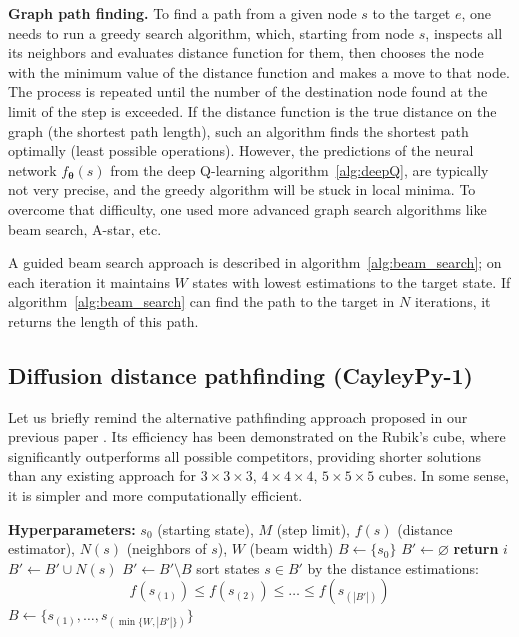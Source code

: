 \documentclass[reqno,11pt]{amsart}
\begin{document}
{\bf Graph path finding.}
To find a path from a given node $s$ to the target  $e$, one needs to run a greedy search algorithm, which, starting from node $s$, inspects all its neighbors and evaluates distance function for them, then chooses the node with the minimum value of the distance function and makes a move to that node. The process is repeated until the number of the destination node found at the limit of the step is exceeded. If the distance function is the true distance on the graph (the shortest path length), such an algorithm finds the shortest path optimally (least possible operations). However, the predictions of the neural network $f_{\boldsymbol \theta}(s)$ from the deep Q-learning algorithm~\ref{alg:deepQ}, are typically not very precise, and the greedy algorithm will be stuck in local minima. To overcome that difficulty, one used more advanced graph search algorithms like beam search, A-star, etc. 

A guided beam search approach is described in algorithm~\ref{alg:beam_search}; on each iteration it maintains $W$ states with lowest estimations to the target state. If algorithm~\ref{alg:beam_search} can find the path to the target in $N$ iterations, it returns the length of this path.


\subsection{Diffusion distance pathfinding (CayleyPy-1)}\label{sec-DD}
Let us briefly remind the alternative pathfinding approach proposed in our previous paper \cite{chervov2025machinelearningapproachbeats}. Its efficiency has been demonstrated on the Rubik's cube, where significantly outperforms all possible competitors, providing shorter solutions than any existing approach for $3\times 3\times3$, $4\times 4\times 4$, $5\times 5\times5$ cubes. In some sense, it is simpler and more computationally efficient.

\begin{algorithm}[t]
 \caption{Guided beam search pathfinding}
 \label{alg:beam_search}
 \begin{algorithmic}[1]
 \STATE \textbf{Hyperparameters:} $s_0$ (starting state), $M$ (step limit), $f(s)$ (distance estimator), $N(s)$ (neighbors of $s$), $W$ (beam width)
 \STATE $B \leftarrow \{s_0\}$
    \STATE $B' \leftarrow \varnothing$
         \STATE \textbf{return} $i$
        \ENDIF
        \STATE $B' \leftarrow B' \cup N(s)$
    \ENDFOR
    \STATE $B' \leftarrow B' \setminus B$
    \STATE sort states $s \in B'$ by the distance estimations: 
    $$
    f(s_{(1)}) \le f(s_{(2)}) \le \ldots \le f(s_{(|B'|)})
    $$ 
    \vspace{-5mm}
    \STATE $B\leftarrow \{s_{(1)}, \ldots, s_{(\min\{W, |B'|\})}\}$
 \ENDFOR
 \end{algorithmic}
 \end{algorithm}
 
\end{document}
